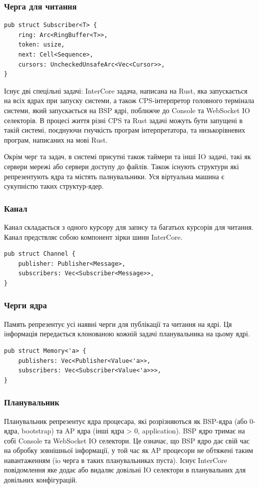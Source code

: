 \documentclass{article}
\begin{document}
\subsubsection{Черга для читання}
\begin{lstlisting}
pub struct Subscriber<T> {
    ring: Arc<RingBuffer<T>>,
    token: usize,
    next: Cell<Sequence>,
    cursors: UncheckedUnsafeArc<Vec<Cursor>>,
}
\end{lstlisting}

Існує дві спецільні задачі: InterCore задача, написана на Rust,
яка запускається на всіх ядрах при запуску системи, а також CPS-інтерпретор
головного термінала системи, який запускається на BSP ядрі, поближче до Console та WebSocket IO селекторів.
В процесі життя різні CPS та Rust задачі можуть бути запущені в такій системі,
поєднуючи гнучкість програм інтерпретатора, та низькорівневих програм, написаних на мові Rust.

Окрім черг та задач, в системі присутні також таймери та інші IO задачі,
такі як сервери мережі або сервери доступу до файлів. Також існують
структури які репрезентують ядра та містять палнувальники.
Уся віртуальна машина є сукупністю таких структур-ядер.

\newpage
\subsubsection{Канал}
Канал складається з одного курсору для запису та багатьох курсорів для читання.
Канал предствляє собою компонент зірки шини InterCore.
\begin{lstlisting}
pub struct Channel {
    publisher: Publisher<Message>,
    subscribers: Vec<Subscriber<Message>>,
}
\end{lstlisting}


\subsubsection{Черги ядра}
Память репрезентує усі наявні черги для публікації та читання на ядрі.
Ця інформація передається клонованою кожній задачі планувальника на цьому ядрі.
\begin{lstlisting}
pub struct Memory<'a> {
    publishers: Vec<Publisher<Value<'a>>,
    subscribers: Vec<Subscriber<Value<'a>>>,
}
\end{lstlisting}

\subsubsection{Планувальник}
Планувальник репрезентує ядра процесара,
які розрізняються як BSP-ядра (або 0-ядра, bootstrap)
та AP ядра (інші ядра > 0, application). BSP ядро
тримає на собі Console та WebSocket IO селектори.
Це означає, що BSP ядро дає свій час на обробку зовнішньої інформації,
у той час як AP процесори не обтяжені
таким навантаженням (io черга в таких планувальниках пуста).
Існує InterCore повідомлення яке додає або видаляє довільні IO селектори
в планувальних для довільних конфігурацій.
\end{document}
